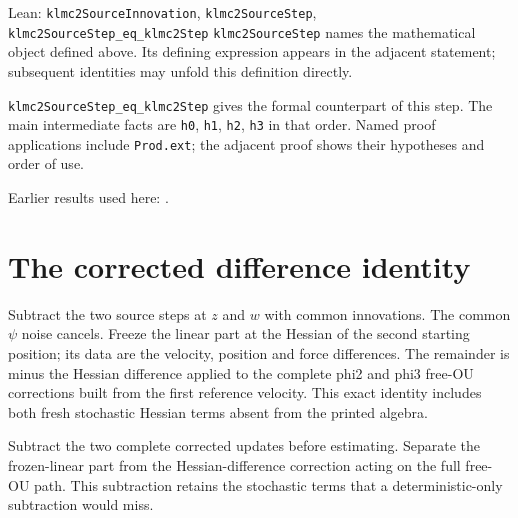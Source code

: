 \documentclass[11pt,a4paper]{article}
\begin{document}
\begin{leanbox}{Lean: \texttt{klmc2SourceInnovation}, \texttt{klmc2SourceStep}, \texttt{klmc2SourceStep\_\allowbreak{}eq\_\allowbreak{}klmc2Step}}
\texttt{klmc2\allowbreak{}Source\allowbreak{}Step} names the mathematical object defined above. Its defining expression appears in the adjacent statement; subsequent identities may unfold this definition directly.




\texttt{klmc2\allowbreak{}Source\allowbreak{}Step\_\allowbreak{}eq\_\allowbreak{}klmc2\allowbreak{}Step} gives the formal counterpart of this step. The main intermediate facts are \texttt{h0}, \texttt{h1}, \texttt{h2}, \texttt{h3} in that order. Named proof applications include \texttt{Prod.\allowbreak{}ext}; the adjacent proof shows their hypotheses and order of use.
\end{leanbox}


Earlier results used here: \cite[Section~3.8.17]{LangevinLean2026ULASC}.

\section{\texorpdfstring{The corrected difference identity}{The corrected difference identity}}


Subtract the two source steps at \(z\) and \(w\) with common innovations. The common \(\psi\) noise cancels. Freeze the linear part at the Hessian of the second starting position; its data are the velocity, position and force differences. The remainder is minus the Hessian difference applied to the complete phi2 and phi3 free-OU corrections built from the first reference velocity. This exact identity includes both fresh stochastic Hessian terms absent from the printed algebra.



Subtract the two complete corrected updates before estimating. Separate the frozen-linear part from the Hessian-difference correction acting on the full free-OU path. This subtraction retains the stochastic terms that a deterministic-only subtraction would miss.
\end{document}
